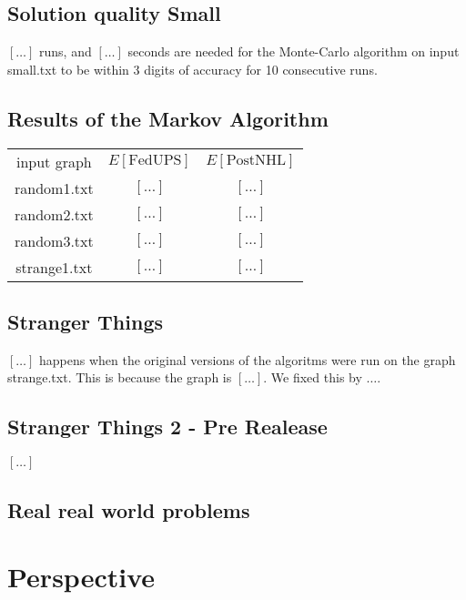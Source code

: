 \documentclass{tufte-handout}
\begin{document}
\subsection{Solution quality Small}

$[\ldots]$ runs, and $[\ldots]$ seconds are needed for the Monte-Carlo algorithm on input small.txt to be within $3$ digits of accuracy for 10 consecutive runs.

\subsection{Results of the Markov Algorithm}

\begin{tabular}{c c c}
    input graph & $E[\text{FedUPS}]$ & $E[\text{PostNHL}]$ \\
    random1.txt & $[\ldots]$ & $[\ldots]$ \\
    random2.txt & $[\ldots]$ & $[\ldots]$ \\
    random3.txt & $[\ldots]$ & $[\ldots]$ \\
    strange1.txt & $[\ldots]$ & $[\ldots]$ \\
\end{tabular}

\subsection{Stranger Things}
$[\ldots]$ happens when the original versions of the algoritms were run on the graph strange.txt. This is because the graph is $[\ldots]$. We fixed this by ${\ldots}$.

\subsection{Stranger Things 2 - Pre Realease}
$[\ldots]$


\subsection{Real real world problems}



\section{Perspective}
\end{document}
